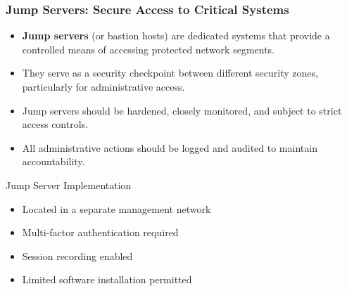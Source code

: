 \documentclass{beamer}
\begin{document}
\begin{frame}
    \frametitle{Jump Servers: Secure Access to Critical Systems}
    \begin{itemize}
        \item \textbf{Jump servers} (or bastion hosts) are dedicated systems that provide a controlled means of accessing protected network segments.
        \item They serve as a security checkpoint between different security zones, particularly for administrative access.
        \item Jump servers should be hardened, closely monitored, and subject to strict access controls.
        \item All administrative actions should be logged and audited to maintain accountability.
    \end{itemize}
    
    \begin{exampleblock}{Jump Server Implementation}
        \begin{itemize}
            \item Located in a separate management network
            \item Multi-factor authentication required
            \item Session recording enabled
            \item Limited software installation permitted
        \end{itemize}
    \end{exampleblock}
\end{frame}
\end{document}
